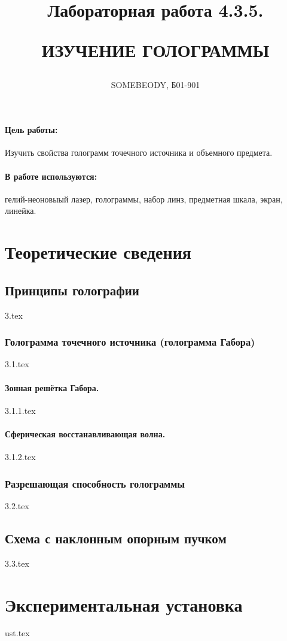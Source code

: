 \documentclass[a5paper,10pt, twoside]{article} %
\title
{
\hfill \break	\hfill \break
\hfill \break	\hfill \break
Лабораторная работа 4.3.5.

ИЗУЧЕНИЕ ГОЛОГРАММЫ
}
\author{SOMEBEODY, Б01-901}
\begin{document}
\maketitle


\thispagestyle{empty} %

\newpage

\tableofcontents %
\thispagestyle{plain}
\newpage


\paragraph{Цель работы:}

Изучить свойства голограмм точечного источника и объемного предмета.

\paragraph{В работе используются:}

гелий-неоновыый лазер, голограммы, набор линз, предметная шкала, экран, линейка.

\section{Теоретические сведения}

  \subsection{Принципы голографии}
  {3.tex}

    \subsubsection{Голограмма точечного источника (голограмма Габора)}
    {3.1.tex}

      \paragraph{Зонная решётка Габора.}
      {3.1.1.tex}

      \paragraph{Сферическая восстанавливающая волна.}
      {3.1.2.tex}
    
    \subsubsection{Разрешающая способность голограммы}
    {3.2.tex}

    \subsection{Схема с наклонным опорным пучком}
    {3.3.tex}

  \section{Экспериментальная установка}
  {ust.tex}
\end{document}
